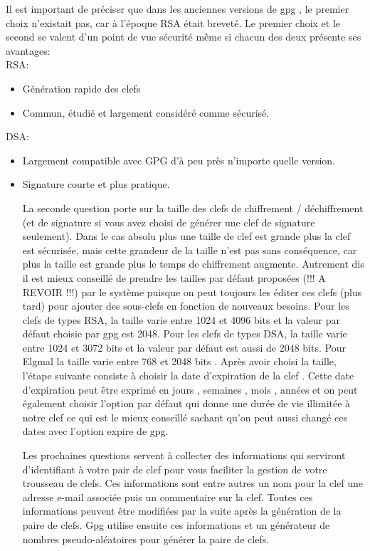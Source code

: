 Il est important de préciser que dans les anciennes versions de gpg , le premier choix n’existait pas, car à l'époque RSA
était breveté.
Le premier choix et le second se valent d’un point de vue sécurité même si chacun des deux présente ses avantages:\\
RSA:\\ 
\begin{itemize}
\item Génération rapide des clefs
\item Commun, étudié et largement considéré comme sécurisé.
\end{itemize}
DSA:\\
\begin{itemize}
\item Largement compatible avec GPG d'à peu près n’importe quelle version. 
\item Signature courte et plus pratique.

La seconde question porte sur la taille des clefs de chiffrement / déchiffrement (et de signature si vous avez choisi de générer une 
clef de signature seulement).
Dans le cas absolu plus une taille de clef est grande plus la clef est sécurisée, mais cette grandeur de la taille n'est pas sans
conséquence, car plus la taille est grande plus le temps de chiffrement augmente. Autrement dis il est mieux conseillé de prendre les
tailles par défaut proposées (!!! A REVOIR !!!) par le système puisque on peut toujours les éditer ces clefs (plus tard) pour ajouter des sous-clefs en 
fonction de nouveaux besoins. 
Pour les clefs de types RSA, la taille varie entre 1024 et 4096 bits et la valeur par défaut choisie par gpg est 2048.
Pour les clefs de types DSA, la taille varie entre 1024 et 3072 bits et la valeur par défaut est aussi de 2048 bits.
Pour Elgmal la taille varie entre 768 et 2048 bits .
Après avoir choisi la taille, l'étape suivante consiste à choisir la date d'expiration de la clef .
Cette date d'expiration peut être exprimé en jours , semaines , mois , années et on peut également choisir l'option par défaut qui 
donne une durée de vie illimitée à notre clef ce qui est le mieux conseillé sachant qu'on peut aussi changé ces  dates avec l'option 
expire de gpg.

Les prochaines questions servent à collecter des informations qui serviront d'identifiant à votre pair de clef pour vous faciliter la
gestion de votre trousseau de clefs. Ces informations sont entre autres un nom pour la clef une adresse e-mail associée puis un commentaire 
sur la clef. Toutes ces informations peuvent être modifiées par la suite après la génération de la paire de clefs.
Gpg utilise ensuite ces informations et un générateur de nombres pseudo-aléatoires pour générer la paire de clefs.


\end{itemize}
